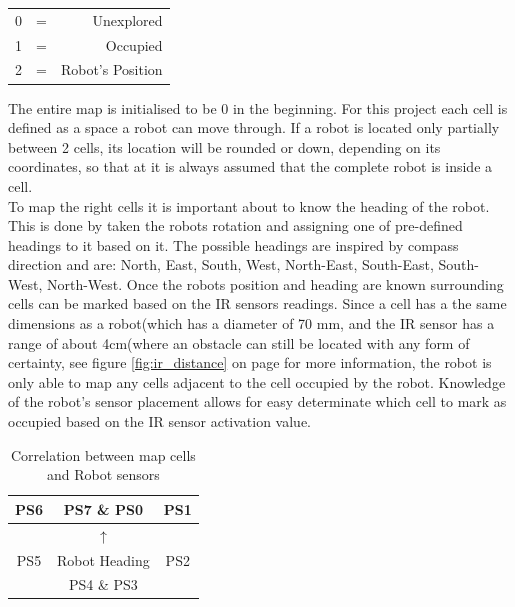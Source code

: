 \begin{table}[h]
\begin{center}
\begin{tabular}{l c r}
0 & = & Unexplored \\
1 & = & Occupied \\
2 & = & Robot's Position \\
\end{tabular}
\end{center}
\end{table}

The entire map is initialised to be 0 in the beginning. For this project each cell is defined as a space a robot can move through. 
If a robot is located only partially between 2 cells, its location will be rounded or down, depending on its coordinates, so that at it is always assumed that the complete robot is inside a cell.\\

To map the right cells it is important about to know the heading of the robot. This is done by taken the robots rotation and assigning one of pre-defined headings to it based on it. 
The possible headings are inspired by compass direction and are: North, East, South, West, North-East, South-East, South-West, North-West.
Once the robots position and heading are known surrounding cells can be marked based on the IR sensors readings. Since a cell has a the same dimensions as a robot(which has a diameter of 70 mm, and the IR sensor has a range of about 4cm(where an obstacle can still be located with any form of certainty, see figure \ref{fig:ir_distance} on page \pageref{fig:ir_distance} for more information, the robot is only able to map any cells adjacent to the cell occupied by the robot. 
Knowledge of the robot's sensor placement allows for easy determinate which cell to mark as occupied based on the IR sensor activation value. \\

\begin{table}[h]
\begin{center}
\begin{tabular}{c | c | c}
PS6 & PS7 \& PS0 & PS1 \\\hline
 & $\uparrow$ & \\
PS5 & Robot Heading & PS2 \\\hline
 & PS4 \& PS3 & 
\end{tabular}
\caption{Correlation between map cells and Robot sensors}
\label{tab:cells}
\end{center}
\end{table}

